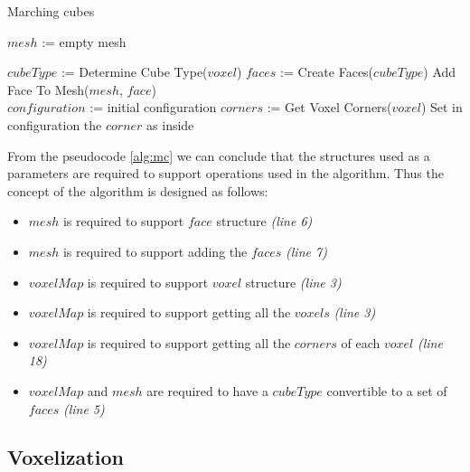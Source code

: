 \begin{algorithm}[H]
\caption{Marching cubes}
\label{alg:mc}
\begin{algorithmic}[1]
			\State $mesh$ := empty mesh

			\State $cubeType$ := Determine Cube Type($voxel$)
			\State $faces$ := Create Faces($cubeType$)
				\State Add Face To Mesh($mesh$, $face$)
			\EndFor
		\EndFor
		\State {}
	\EndFunction
	\\
		\State $configuration$ := initial configuration
		\State {}
		\State {}
		\State {}
		\State $corners$ := Get Voxel Corners($voxel$)
				\State Set in configuration the $corner$ as inside
			\EndIf
		\EndFor
		\State {}
	\EndFunction
\end{algorithmic}
\end{algorithm}



From the pseudocode \ref{alg:mc} we can conclude that the structures used as a parameters
are required to support operations used in the algorithm. Thus the concept of the algorithm
is designed as follows:

\begin{itemize}
\item $mesh$ is required to support $face$ structure \emph{(line 6)}
\item $mesh$ is required to support adding the $faces$ \emph{(line 7)}
\item $voxelMap$ is required to support $voxel$ structure \emph{(line 3)}
\item $voxelMap$ is required to support getting all the $voxels$ \emph{(line 3)}
\item $voxelMap$ is required to support getting all the $corners$ of each $voxel$ \emph{(line 18)}
\item $voxelMap$ and $mesh$ are required to have a $cubeType$ convertible to a set of $faces$ \emph{(line 5)}
\end{itemize}

\subsection{Voxelization}

